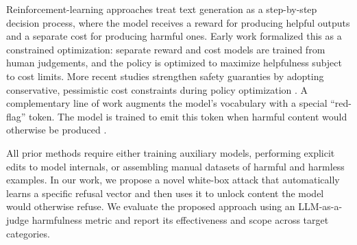 \documentclass{article}
\theoremstyle{plain}
\theoremstyle{definition}
\theoremstyle{remark}
\begin{document}
Reinforcement-learning approaches treat text generation as a step-by-step decision process, where the model receives a reward for producing helpful outputs and a separate cost for producing harmful ones. Early work \cite{dai2023safe} formalized this as a constrained optimization: separate reward and cost models are trained from human judgements, and the policy is optimized to maximize helpfulness subject to cost limits. More recent studies strengthen safety guaranties by adopting conservative, pessimistic cost constraints during policy optimization \cite{chittepu2025reinforcement}. A complementary line of work augments the model's vocabulary with a special “red-flag” token. The model is trained to emit this token when harmful content would otherwise be produced \cite{xhonneux2025generative}.

All prior methods require either training auxiliary models, performing explicit edits to model internals, or assembling manual datasets of harmful and harmless examples. In our work, we propose a novel white-box attack that automatically learns a specific refusal vector and then uses it to unlock content the model would otherwise refuse. We evaluate the proposed approach using an LLM-as-a-judge harmfulness metric and report its effectiveness and scope across target categories.



\end{document}
